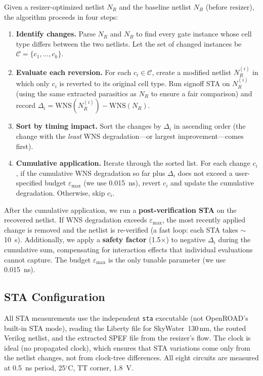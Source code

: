 \documentclass[journal]{IEEEtran}
\begin{document}
Given a resizer-optimized netlist $N_R$ and the baseline netlist $N_B$
(before resizer), the algorithm proceeds in four steps:

\begin{enumerate}
\item \textbf{Identify changes.} Parse $N_R$ and $N_B$ to find every
gate instance whose cell type differs between the two netlists. Let the
set of changed instances be $\mathcal{C} = \{c_1, \ldots, c_k\}$.

\item \textbf{Evaluate each reversion.} For each $c_i \in \mathcal{C}$,
create a modified netlist $N_R^{(i)}$ in which only $c_i$ is reverted to
its original cell type. Run signoff STA on $N_R^{(i)}$ (using the same
extracted parasitics as $N_R$ to ensure a fair comparison) and record
$\Delta_i = \text{WNS}(N_R^{(i)}) - \text{WNS}(N_R)$.

\item \textbf{Sort by timing impact.} Sort the changes by $\Delta_i$ in
ascending order (the change with the \emph{least} WNS degradation---or
largest improvement---comes first).

\item \textbf{Cumulative application.} Iterate through the sorted list.
For each change $c_i$, if the cumulative WNS degradation so far plus
$\Delta_i$ does not exceed a user-specified budget
$\varepsilon_{\text{max}}$ (we use 0.015~ns), revert $c_i$ and update the
cumulative degradation. Otherwise, skip $c_i$.
\end{enumerate}

After the cumulative application, we run a \textbf{post-verification STA}
on the recovered netlist. If WNS degradation exceeds
$\varepsilon_{\text{max}}$, the most recently applied change is removed
and the netlist is re-verified (a fast loop: each STA takes $\sim$10~s).
Additionally, we apply a \textbf{safety factor} (1.5$\times$) to negative
$\Delta_i$ during the cumulative sum, compensating for interaction
effects that individual evaluations cannot capture. The budget
$\varepsilon_{\text{max}}$ is the only tunable parameter (we use
0.015~ns).

\subsection{STA Configuration}

All STA measurements use the independent \texttt{sta} executable (not
OpenROAD's built-in STA mode), reading the Liberty file for
SkyWater~130\,nm, the routed Verilog netlist, and the extracted SPEF file
from the resizer's flow. The clock is ideal (no propagated clock), which
ensures that STA variations come only from the netlist changes, not from
clock-tree differences. All eight circuits are measured at 0.5~ns period,
25$^\circ$C, TT corner, 1.8~V.
\end{document}
